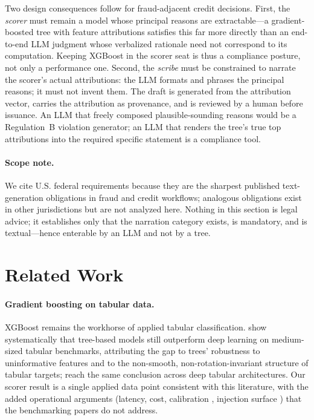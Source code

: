 \documentclass{article}
\begin{document}
Two design consequences follow for fraud-adjacent credit decisions. First, the
\emph{scorer} must remain a model whose principal reasons are extractable---a
gradient-boosted tree with feature attributions satisfies this far more
directly than an end-to-end LLM judgment whose verbalized rationale need not
correspond to its computation. Keeping XGBoost in the scorer seat is thus a
compliance posture, not only a performance one. Second, the \emph{scribe} must
be constrained to narrate the scorer's actual attributions: the LLM formats
and phrases the principal reasons; it must not invent them. The draft is
generated from the attribution vector, carries the attribution as provenance,
and is reviewed by a human before issuance. An LLM that freely composed
plausible-sounding reasons would be a Regulation~B violation generator; an LLM
that renders the tree's true top attributions into the required specific
statement is a compliance tool.

\paragraph{Scope note.} We cite U.S. federal requirements because they are the
sharpest published text-generation obligations in fraud and credit workflows;
analogous obligations exist in other jurisdictions but are not analyzed here.
Nothing in this section is legal advice; it establishes only that the
narration category exists, is mandatory, and is textual---hence enterable by
an LLM and not by a tree.
 \section{Related Work}
\label{sec:p8-related}

\paragraph{Gradient boosting on tabular data.} XGBoost
\citep{chen2016xgboost} remains the workhorse of applied tabular
classification. \citet{grinsztajn2022tree} show systematically that tree-based
models still outperform deep learning on medium-sized tabular benchmarks,
attributing the gap to trees' robustness to uninformative features and to the
non-smooth, non-rotation-invariant structure of tabular targets;
\citet{shwartzziv2021tabular} reach the same conclusion across deep tabular
architectures. Our scorer result is a single applied data point consistent
with this literature, with the added operational arguments (latency, cost,
calibration \citep{guo2017calibration}, injection surface
\citep{greshake2023injection}) that the benchmarking papers do not address.
\end{document}
